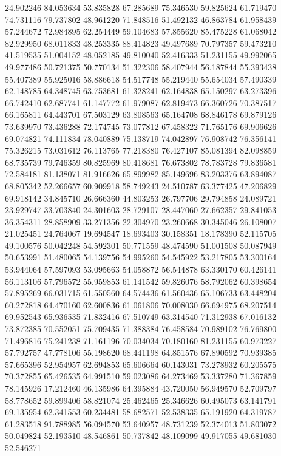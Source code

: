 24.902246
84.053634
53.835828
67.285689
75.346530
59.825624
61.719470
74.731116
79.737802
48.961220
71.848516
51.492132
46.863784
61.958439
57.244672
72.984895
62.254449
59.104683
57.855620
85.475228
61.068042
82.929950
68.011833
48.253335
88.414823
49.497689
70.797357
59.473210
41.519535
51.004152
48.052185
49.810040
52.416333
51.231155
49.992065
49.977486
50.721375
50.770134
51.322306
58.407944
56.187844
55.393438
55.407389
55.925016
58.886618
54.517748
55.219440
55.654034
57.490339
62.148785
64.348745
63.753681
61.328241
62.164838
65.150297
63.273396
66.742410
62.687741
61.147772
61.979087
62.819473
66.360726
70.387517
66.165811
64.443701
67.503129
63.808563
65.164708
68.846178
69.879126
73.639970
73.436288
72.174745
73.077812
67.458322
71.765176
69.906626
69.074821
74.111834
78.040889
75.138719
74.042897
76.908742
76.356141
75.326215
73.031612
76.113765
77.218380
76.427107
85.081394
82.098859
68.735739
79.746359
80.825969
80.418681
76.673802
78.783728
79.836581
72.584181
81.138071
81.916626
65.899982
85.149696
83.203376
63.894087
68.805342
52.266657
60.909918
58.749243
24.510787
63.377425
47.206829
69.918142
34.845710
26.666360
44.803253
26.797706
29.794858
24.089721
23.929747
33.703840
24.301603
28.729107
28.447060
27.662357
29.841053
36.354311
28.858909
33.271356
22.304970
23.260668
30.345046
26.108007
21.025451
24.764067
19.694547
18.693403
30.158351
18.178390
52.115705
49.100576
50.042248
54.592301
50.771559
48.474590
51.001508
50.087949
50.653991
51.480065
54.139756
54.995260
54.545922
53.217805
53.300164
53.944064
57.597093
53.095663
54.058872
56.544878
63.330170
60.426141
56.113106
57.796572
55.959853
61.141542
59.826076
58.792062
60.398654
57.895269
66.031715
61.550560
64.574436
61.560436
65.106733
63.448204
60.272818
64.470160
62.600836
61.061806
70.008030
66.694975
68.207514
69.952543
65.936535
71.832416
67.510749
63.314540
71.312938
67.016132
73.872385
70.552051
75.709435
71.388384
76.458584
70.989102
76.769800
71.496816
75.241238
71.161196
70.034034
70.180160
81.231155
60.973227
57.792757
47.778106
55.198620
68.441198
64.851576
67.890592
70.939385
57.665396
52.954957
62.694853
65.606664
60.143031
73.278932
60.205575
70.372855
65.426535
64.991510
59.023086
64.273469
53.337280
71.367859
78.145926
17.212460
46.135986
64.395884
43.720050
56.949570
52.709797
58.778652
59.899406
58.821074
25.462465
25.346626
60.495073
63.141791
69.135954
62.341553
60.234481
58.682571
52.538335
65.191920
64.319787
61.283518
91.788985
56.094570
53.640957
48.731239
52.374013
51.803072
50.049824
52.193510
48.546861
50.737842
48.109099
49.917055
49.681030
52.546271
